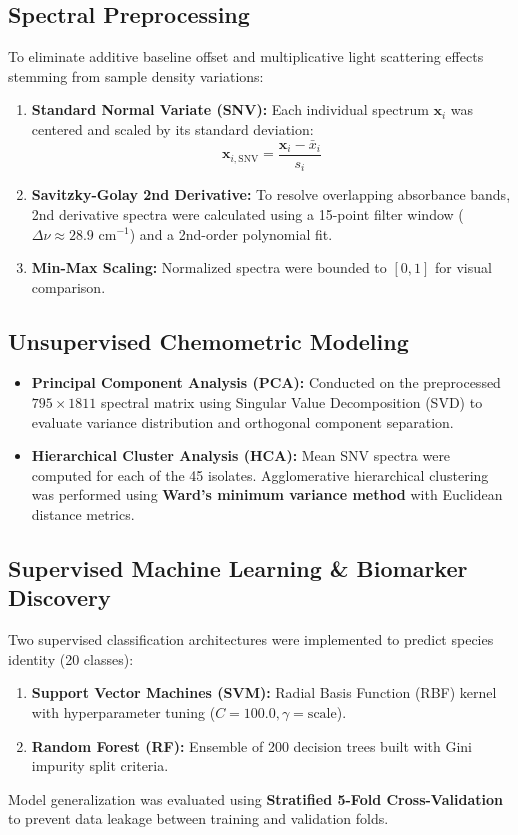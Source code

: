 \documentclass[11pt,a4paper]{article}
\begin{document}
\subsection{Spectral Preprocessing}
To eliminate additive baseline offset and multiplicative light scattering effects stemming from sample density variations:
\begin{enumerate}
    \item \textbf{Standard Normal Variate (SNV):} Each individual spectrum $\mathbf{x}_i$ was centered and scaled by its standard deviation:
    \begin{equation}
        \mathbf{x}_{i,\text{SNV}} = \frac{\mathbf{x}_i - \bar{x}_i}{s_i}
    \end{equation}
    \item \textbf{Savitzky-Golay 2nd Derivative:} To resolve overlapping absorbance bands, 2nd derivative spectra were calculated using a 15-point filter window ($\Delta \nu \approx 28.9\text{ cm}^{-1}$) and a 2nd-order polynomial fit.
    \item \textbf{Min-Max Scaling:} Normalized spectra were bounded to $[0, 1]$ for visual comparison.
\end{enumerate}

\subsection{Unsupervised Chemometric Modeling}
\begin{itemize}
    \item \textbf{Principal Component Analysis (PCA):} Conducted on the preprocessed $795 \times 1811$ spectral matrix using Singular Value Decomposition (SVD) to evaluate variance distribution and orthogonal component separation.
    \item \textbf{Hierarchical Cluster Analysis (HCA):} Mean SNV spectra were computed for each of the 45 isolates. Agglomerative hierarchical clustering was performed using \textbf{Ward's minimum variance method} with Euclidean distance metrics.
\end{itemize}

\subsection{Supervised Machine Learning \& Biomarker Discovery}
Two supervised classification architectures were implemented to predict species identity (20 classes):
\begin{enumerate}
    \item \textbf{Support Vector Machines (SVM):} Radial Basis Function (RBF) kernel with hyperparameter tuning ($C = 100.0, \gamma = \text{scale}$).
    \item \textbf{Random Forest (RF):} Ensemble of 200 decision trees built with Gini impurity split criteria.
\end{enumerate}
Model generalization was evaluated using \textbf{Stratified 5-Fold Cross-Validation} to prevent data leakage between training and validation folds.
\end{document}
